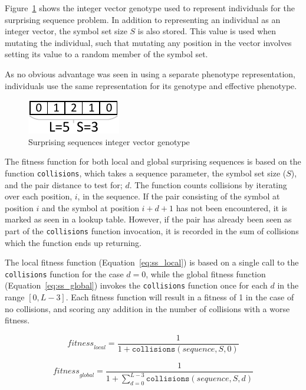 Figure~\ref{fig:surprising_genotype} shows the integer vector genotype used to represent individuals for the surprising sequence problem. In addition to representing an individual as an integer vector, the symbol set size $S$ is also stored. This value is used when mutating the individual, such that mutating any position in the vector involves setting its value to a random member of the symbol set.

As no obvious advantage was seen in using a separate phenotype representation, individuals use the same representation for its genotype and effective phenotype.

\begin{figure}[H]
\centering
\includegraphics[scale=1.0]{images/surprising_genotype}
\caption{Surprising sequences integer vector genotype}
\label{fig:surprising_genotype}
\end{figure}

The fitness function for both local and global surprising sequences is based on the function \texttt{collisions}, which takes a sequence parameter, the symbol set size ($S$), and the pair distance to test for; $d$. The function counts collisions by iterating over each position, $i$, in the sequence. If the pair consisting of the symbol at position $i$ and the symbol at position $i+d+1$ has not been encountered, it is marked as seen in a lookup table. However, if the pair has already been seen as part of the \texttt{collisions} function invocation, it is recorded in the sum of collisions which the function ends up returning.

The local fitness function (Equation~\ref{eq:ss_local}) is based on a single call to the \texttt{collisions} function for the case $d=0$, while the global fitness function (Equation~\ref{eq:ss_global}) invokes the \texttt{collisions} function once for each $d$ in the range $[0, L-3]$. Each fitness function will result in a fitness of 1 in the case of no collisions, and scoring any addition in the number of collisions with a worse fitness.

\begin{equation}
\label{eq:ss_local}
\textit{fitness}_\textit{local} = \frac{1}{1 + \texttt{collisions}(\textit{sequence}, S, 0)}
\end{equation}

\begin{equation}
\label{eq:ss_global}
\textit{fitness}_\textit{global} = \frac{1}{1 + \sum_{d=0}^{L - 3} \texttt{collisions}(\textit{sequence}, S, d)}
\end{equation}

